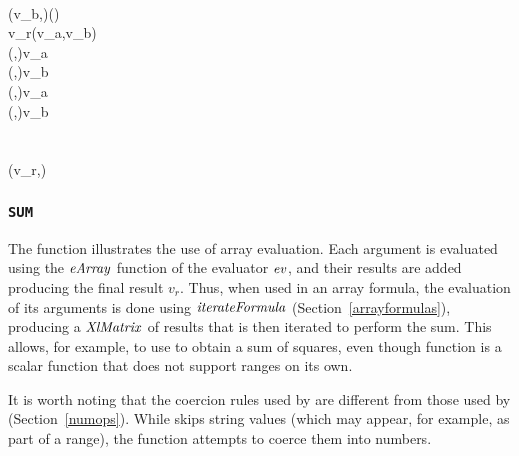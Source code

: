 \begin{hscode}
\\
\>[4]{}\<[7]%
\>[7]{}(v_b,)\mathrel{=}\mathbin{\$}(\;)\;\;\;\<[E]%
\\
\>[4]{}\<[7]%
\>[7]{}v_r\mathrel{=}\;(v_a,v_b)\;\<[E]%
\\
\>[7]{}\<[12]%
\>[12]{}(\;\anonymous ,\anonymous ){}\<[30]%
\>[30]{}\to v_a{}\<[E]%
\\
\>[7]{}\<[12]%
\>[12]{}(\anonymous ,\;\anonymous ){}\<[30]%
\>[30]{}\to v_b{}\<[E]%
\\
\>[7]{}\<[12]%
\>[12]{}(\;,\anonymous ){}\<[30]%
\>[30]{}\to v_a{}\<[E]%
\\
\>[7]{}\<[12]%
\>[12]{}(\anonymous ,\;){}\<[30]%
\>[30]{}\to v_b{}\<[E]%
\\
\>[7]{}\<[12]%
\>[12]{}\anonymous {}\<[30]%
\>[30]{}\to {}\;\<[E]%
\\
\>[B]{}\<[4]%
\>[4]{}\<[E]%
\\
\>[4]{}\<[7]%
\>[7]{}(v_r,){}\<[E]%
\ColumnHook
\end{hscode}\resethooks

\subsubsection{\texttt{SUM}}

The  function illustrates the use of array evaluation. Each argument is
evaluated using the \ensuremath{\Varid{eArray}} function of the evaluator \ensuremath{\Varid{ev}}, and their results
are added producing the final result \ensuremath{v_r}. Thus, when used in an array
formula, the evaluation of its arguments is done using \ensuremath{\Varid{iterateFormula}}
(Section~\ref{arrayformulas}), producing a \ensuremath{\Conid{XlMatrix}} of results that is then
iterated to perform the sum. This allows, for example, to use
 to obtain a sum of squares, even though function 
is a scalar function that does not support ranges on its own.

It is worth noting that the coercion rules used by  are different from
those used by  (Section~\ref{numops}). While  skips string values
(which may appear, for example, as part of a range), the  function attempts
to coerce them into numbers.

